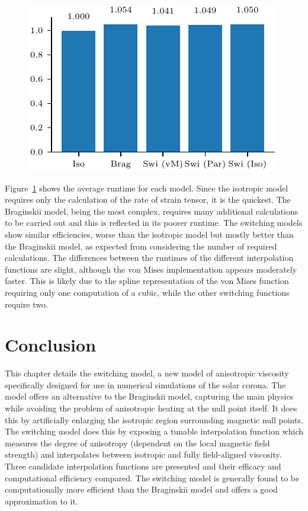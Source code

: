 \begin{figure}[t]
  \centering
  \includegraphics[width=0.5\linewidth]{benchmark.pdf}
  \label{fig:benchmark}
\end{figure}

Figure~\ref{fig:benchmark} shows the average runtime for each model. Since the isotropic model requires only the calculation of the rate of strain tensor, it is the quickest. The Braginskii model, being the most complex, requires many additional calculations to be carried out and this is reflected in its poorer runtime. The switching models show similar efficiencies, worse than the isotropic model but mostly better than the Braginskii model, as expected from considering the number of required calculations. The differences between the runtimes of the different interpolation functions are slight, although the von Mises implementation appears moderately faster. This is likely due to the spline representation of the von Mises function requiring only one computation of a cubic, while the other switching functions require two.

\section{Conclusion}

This chapter details the switching model, a new model of anisotropic viscosity specifically designed for use in numerical simulations of the solar corona. The model offers an alternative to the Braginskii model, capturing the main physics while avoiding the problem of anisotropic heating at the null point itself. It does this by artificially enlarging the isotropic region surrounding magnetic null points. The switching model does this by exposing a tunable interpolation function which measures the degree of anisotropy (dependent on the local magnetic field strength) and interpolates between isotropic and fully field-aligned viscosity. Three candidate interpolation functions are presented and their efficacy and computational efficiency compared. The switching model is generally found to be computationally more efficient than the Braginskii model and offers a good approximation to it.

